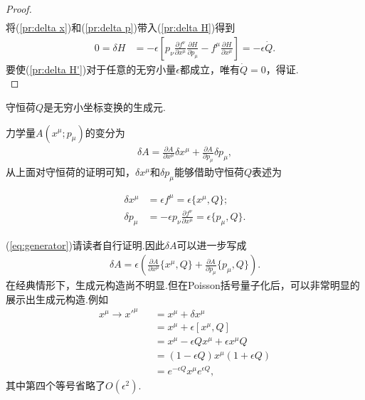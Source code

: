 \begin{proof}
\begin{equation}
\begin{split}
		\end{split}
		\end{equation}	
		将(\ref{pr:delta x})和(\ref{pr:delta p})带入(\ref{pr:delta H})得到
		\begin{equation}\label{pr:delta H'}
		\begin{split}
			0=\delta H&=-\epsilon\left[p_\nu\frac{\partial f^\nu}{\partial x^\mu}\frac{\partial H}{\partial p_\mu}-f^\mu\frac{\partial H}{\partial x^\mu}\right]=-\epsilon\dot{Q}.
		\end{split}
		\end{equation}
		要使(\ref{pr:delta H'})对于任意的无穷小量$\epsilon$都成立，唯有$\dot{Q}=0$，得证.\\
		\end{proof}
	
		\begin{theorem}
		守恒荷$Q$是无穷小坐标变换的生成元.
		\end{theorem}
	
		力学量$A(x^\mu;p_\mu)$的变分为
		\begin{eqnarray*}
		\delta A=\frac{\partial A}{\partial x^\mu}\delta x^\mu+\frac{\partial A}{\partial p_\mu}\delta p_\mu,
		\end{eqnarray*}
		从上面对守恒荷的证明可知，$\delta x^\mu$和$\delta p_\mu$能够借助守恒荷$Q$表述为
		\begin{exercise}
			\begin{equation}\label{eq:generator}
				\begin{split}
					\delta x^\mu&=\epsilon f^\mu=\epsilon\{x^\mu,Q\};\\
					\delta p_\mu&=-\epsilon p_\nu\frac{\partial f^\nu}{\partial x^\mu}=\epsilon\{p_\mu,Q\}.
				\end{split}
			\end{equation}
		\end{exercise}
		
		(\ref{eq:generator})请读者自行证明.因此$\delta A$可以进一步写成
		\begin{eqnarray*}
		\delta A=\epsilon\left(\frac{\partial A}{\partial x^\mu}\{x^\mu,Q\}+\frac{\partial A}{\partial p_\mu}\{p_\mu,Q\}\right).
		\end{eqnarray*}
		在经典情形下，生成元构造尚不明显.但在Poisson括号量子化后，可以非常明显的展示出生成元构造.例如
		\begin{eqnarray*}
		x^\mu\rightarrow x'^\mu&&=x^\mu+\delta x^\mu\\
		&&=x^\mu+\epsilon[x^\mu,Q]\\
		&&=x^\mu-\epsilon Qx^\mu+\epsilon x^\mu Q\\
		&&=\left(1-\epsilon Q\right)x^\mu\left(1+\epsilon Q\right)\\
		&&=e^{-\epsilon Q}x^\mu e^{\epsilon Q},
		\end{eqnarray*}
		其中第四个等号省略了$O(\epsilon^2)$.